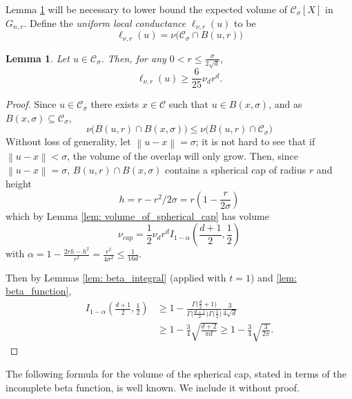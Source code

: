 \documentclass{article}
\newcommand{\norm}[1]{\left\lVert#1\right\rVert}
\newcommand{\1}{\mathbf{1}}
\newcommand{\Xbf}{X}             %
\newcommand{\Cset}{\mathcal{C}}
\newcommand{\Csig}{\Cset_{\sigma}}
\theoremstyle{aldenthm}
\newtheorem{lemma}{Lemma}
\theoremstyle{aldenrmrk}
\begin{document}
Lemma \ref{lem: local_conductance} will be necessary to lower bound the expected volume of $\Csig[\Xbf]$ in $G_{n,r}$. Define the \emph{uniform local conductance} $\ell_{\nu,r}(u)$ to be
\begin{equation*}
\ell_{\nu,r}(u) = \nu\bigl(\Csig \cap B(u,r)\bigr)
\end{equation*}
\begin{lemma}
	\label{lem: local_conductance}
	Let $u \in \Csig$. Then, for any $0 < r \leq \frac{\sigma}{2\sqrt{d}}$,
	\begin{equation*}
	\ell_{\nu,r}(u) \geq \frac{6}{25} \nu_d r^d.
	\end{equation*}
\end{lemma}
\begin{proof}
	Since $u \in \Csig$ there exists $x \in \Cset$ such that $u \in B(x, \sigma)$, and as $B(x,\sigma) \subseteq \Csig$,
	\begin{equation*}
	\nu\bigl(B(u, r) \cap B(x, \sigma)\bigr) \leq \nu\bigl(B(u, r) \cap \Csig \bigr)
	\end{equation*}
	Without loss of generality, let $\norm{u - x} = \sigma$; it is not hard to see that if $\norm{u - x} < \sigma$, the volume of the overlap will only grow. Then, since $\norm{u  - x} = \sigma$, $B(u, r) \cap B(x, \sigma)$ contains a spherical cap of radius $r$ and height
	\begin{equation*}
	h = r - r^2/2\sigma = r \left( 1 - \frac{r}{2 \sigma} \right)
	\end{equation*}	
	which by Lemma \ref{lem: volume_of_spherical_cap} has volume
	\begin{equation*}
	\nu_{cap} = \frac{1}{2} \nu_d r^d I_{1 - \alpha}\left( \frac{d + 1}{2}  ,\frac{1}{2}\right)
	\end{equation*}
	with $\alpha = 1 - \frac{2rh - h^2}{r^2} = \frac{r^2}{4 \sigma^2} \leq \frac{1}{16d}$. 
	
	Then by Lemmas \ref{lem: beta_integral} (applied with $t = 1$) and \ref{lem: beta_function},
	\begin{align*}
	I_{1 - \alpha}\left( \frac{d + 1}{2}  ,\frac{1}{2}\right) & \geq 1 - \frac{\Gamma\bigl(\frac{d}{2}+ 1\bigr)}{\Gamma\bigl(\frac{d + 1}{2}\bigr) \Gamma\bigl(\frac{1}{2}\bigr)} \frac{3}{4\sqrt{d}} \\
	& \geq 1 - \frac{3}{4}\sqrt{\frac{d+2}{\pi d}} \geq 1 - \frac{3}{4}\sqrt{\frac{3}{2 \pi}}.
	\end{align*}
\end{proof}

The following formula for the volume of the spherical cap, stated in terms of the incomplete beta function, is well known. We include it without proof. 
\end{document}
